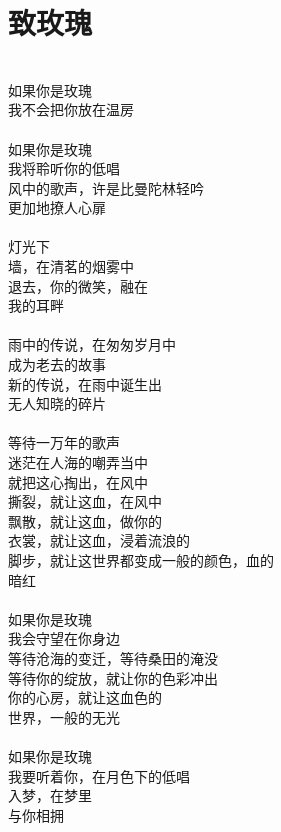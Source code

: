 \section{致玫瑰}
\leftskip=25mm
\noindent \\
如果你是玫瑰 \\
我不会把你放在温房 \\
\\
如果你是玫瑰 \\
我将聆听你的低唱 \\
风中的歌声，许是比曼陀林轻吟 \\
更加地撩人心扉 \\
\\
灯光下 \\
墙，在清茗的烟雾中 \\
退去，你的微笑，融在 \\
我的耳畔 \\
\\
雨中的传说，在匆匆岁月中 \\
成为老去的故事 \\
新的传说，在雨中诞生出 \\
无人知晓的碎片 \\
\\
等待一万年的歌声 \\
迷茫在人海的嘲弄当中 \\
就把这心掏出，在风中 \\
撕裂，就让这血，在风中 \\
飘散，就让这血，做你的 \\
衣裳，就让这血，浸着流浪的 \\
脚步，就让这世界都变成一般的颜色，血的 \\
暗红 \\
\\
如果你是玫瑰 \\
我会守望在你身边 \\
等待沧海的变迁，等待桑田的淹没 \\
等待你的绽放，就让你的色彩冲出 \\
你的心房，就让这血色的 \\
世界，一般的无光 \\
\\
如果你是玫瑰 \\
我要听着你，在月色下的低唱 \\
入梦，在梦里 \\
与你相拥
